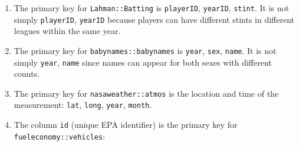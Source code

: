 \documentclass[]{book}
\newenvironment{Shaded}{\begin{snugshade}}{\end{snugshade}}
\newcommand{\CommentTok}[1]{\textcolor[rgb]{0.56,0.35,0.01}{\textit{#1}}}
\newcommand{\DecValTok}[1]{\textcolor[rgb]{0.00,0.00,0.81}{#1}}
\newcommand{\KeywordTok}[1]{\textcolor[rgb]{0.13,0.29,0.53}{\textbf{#1}}}
\newcommand{\NormalTok}[1]{#1}
\newcommand{\OperatorTok}[1]{\textcolor[rgb]{0.81,0.36,0.00}{\textbf{#1}}}
\newcommand{\StringTok}[1]{\textcolor[rgb]{0.31,0.60,0.02}{#1}}
\theoremstyle{plain}
\theoremstyle{remark}
\begin{document}
\begin{enumerate}
\def\labelenumi{\arabic{enumi}.}
\item
  The primary key for \texttt{Lahman::Batting} is \texttt{playerID},
  \texttt{yearID}, \texttt{stint}. It is not simply \texttt{playerID},
  \texttt{yearID} because players can have different stints in different
  leagues within the same year.

\begin{Shaded}
\end{Shaded}
\item
  The primary key for \texttt{babynames::babynames} is \texttt{year},
  \texttt{sex}, \texttt{name}. It is not simply \texttt{year},
  \texttt{name} since names can appear for both sexes with different
  counts.

\begin{Shaded}
\end{Shaded}
\item
  The primary key for \texttt{nasaweather::atmos} is the location and
  time of the measurement: \texttt{lat}, \texttt{long}, \texttt{year},
  \texttt{month}.

\begin{Shaded}
\end{Shaded}
\item
  The column \texttt{id} (unique EPA identifier) is the primary key for
  \texttt{fueleconomy::vehicles}:


\end{enumerate}
\end{document}
